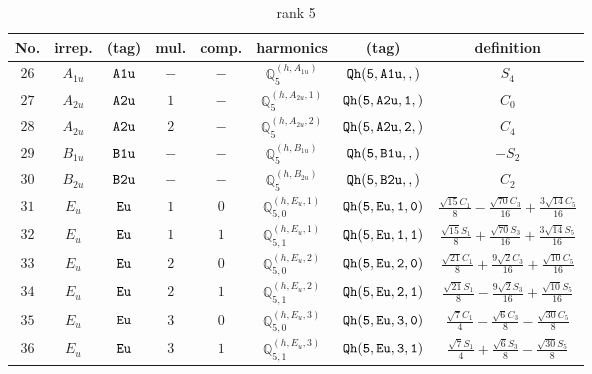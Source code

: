 \documentclass[fleqn,8pt]{jsarticle}
\begin{document}
\begin{table}[ht!]
\begin{center}
\caption{rank 5}
\renewcommand{\arraystretch}{1.3}
\begin{tabular}{cccccccc} \hline \hline
No. & irrep. & (tag) & mul. & comp. & harmonics & (tag) & definition \\ \hline
$ 26 $ & $ A_{1u} $ & $ {\tt A1u} $ & $ - $ & $ - $ & $ \mathbb{Q}_{5}^{(h,A_{1u})} $ & $ {\tt Qh(5,A1u,,)} $ & $ S_{4} $ \\
$ 27 $ & $ A_{2u} $ & $ {\tt A2u} $ & $ 1 $ & $ - $ & $ \mathbb{Q}_{5}^{(h,A_{2u},1)} $ & $ {\tt Qh(5,A2u,1,)} $ & $ C_{0} $ \\
$ 28 $ & $ A_{2u} $ & $ {\tt A2u} $ & $ 2 $ & $ - $ & $ \mathbb{Q}_{5}^{(h,A_{2u},2)} $ & $ {\tt Qh(5,A2u,2,)} $ & $ C_{4} $ \\
$ 29 $ & $ B_{1u} $ & $ {\tt B1u} $ & $ - $ & $ - $ & $ \mathbb{Q}_{5}^{(h,B_{1u})} $ & $ {\tt Qh(5,B1u,,)} $ & $ - S_{2} $ \\
$ 30 $ & $ B_{2u} $ & $ {\tt B2u} $ & $ - $ & $ - $ & $ \mathbb{Q}_{5}^{(h,B_{2u})} $ & $ {\tt Qh(5,B2u,,)} $ & $ C_{2} $ \\
$ 31 $ & $ E_{u} $ & $ {\tt Eu} $ & $ 1 $ & $ 0 $ & $ \mathbb{Q}_{5,0}^{(h,E_{u},1)} $ & $ {\tt Qh(5,Eu,1,0)} $ & $ \frac{\sqrt{15} C_{1}}{8} - \frac{\sqrt{70} C_{3}}{16} + \frac{3 \sqrt{14} C_{5}}{16} $ \\
$ 32 $ & $ E_{u} $ & $ {\tt Eu} $ & $ 1 $ & $ 1 $ & $ \mathbb{Q}_{5,1}^{(h,E_{u},1)} $ & $ {\tt Qh(5,Eu,1,1)} $ & $ \frac{\sqrt{15} S_{1}}{8} + \frac{\sqrt{70} S_{3}}{16} + \frac{3 \sqrt{14} S_{5}}{16} $ \\
$ 33 $ & $ E_{u} $ & $ {\tt Eu} $ & $ 2 $ & $ 0 $ & $ \mathbb{Q}_{5,0}^{(h,E_{u},2)} $ & $ {\tt Qh(5,Eu,2,0)} $ & $ \frac{\sqrt{21} C_{1}}{8} + \frac{9 \sqrt{2} C_{3}}{16} + \frac{\sqrt{10} C_{5}}{16} $ \\
$ 34 $ & $ E_{u} $ & $ {\tt Eu} $ & $ 2 $ & $ 1 $ & $ \mathbb{Q}_{5,1}^{(h,E_{u},2)} $ & $ {\tt Qh(5,Eu,2,1)} $ & $ \frac{\sqrt{21} S_{1}}{8} - \frac{9 \sqrt{2} S_{3}}{16} + \frac{\sqrt{10} S_{5}}{16} $ \\
$ 35 $ & $ E_{u} $ & $ {\tt Eu} $ & $ 3 $ & $ 0 $ & $ \mathbb{Q}_{5,0}^{(h,E_{u},3)} $ & $ {\tt Qh(5,Eu,3,0)} $ & $ \frac{\sqrt{7} C_{1}}{4} - \frac{\sqrt{6} C_{3}}{8} - \frac{\sqrt{30} C_{5}}{8} $ \\
$ 36 $ & $ E_{u} $ & $ {\tt Eu} $ & $ 3 $ & $ 1 $ & $ \mathbb{Q}_{5,1}^{(h,E_{u},3)} $ & $ {\tt Qh(5,Eu,3,1)} $ & $ \frac{\sqrt{7} S_{1}}{4} + \frac{\sqrt{6} S_{3}}{8} - \frac{\sqrt{30} S_{5}}{8} $ \\
 \hline \hline
\end{tabular}
\end{center}
\end{table}
\end{document}
